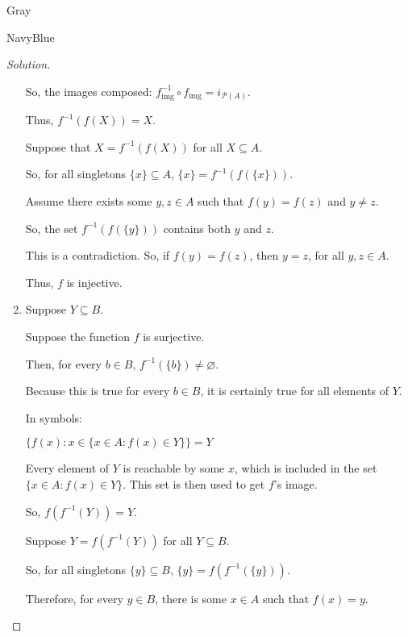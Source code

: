 \documentclass[12pt]{amsart}
\theoremstyle{named}
\newenvironment{soln}
{\begin{color}{Gray}\begin{framed}\begin{color}{NavyBlue}\begin{proof}[Solution]
\doublespacing}
{\end{proof}\end{color}\end{framed}\end{color}}
\theoremstyle{definition}
\begin{document}
\begin{soln}
\begin{enumerate}
        \noindent So, the images composed: $f^{-1}_\text{img} \circ f_\text{img} = i_{\mathscr P(A)}$.
        
        \noindent Thus, $f^{-1}(f(X)) = X$.

        \phantom{ }

        \noindent Suppose that $X = f^{-1}(f(X))$ for all $X \subseteq A$.

        \noindent So, for all singletons $\{x\} \subseteq A$, $\{x\} = f^{-1}(f(\{x\}))$.

        \noindent Assume there exists some $y,z \in A$ such that $f(y) = f(z)$ and $y \neq z$. 

        \noindent So, the set $f^{-1}(f(\{y\}))$ contains both $y$ and $z$. 

        \noindent This is a contradiction. So, if $f(y) = f(z)$, then $y = z$, for all $y,z \in A$.

        \noindent Thus, $f$ is injective.     

        \item
        \phantom{ }
        
        \noindent Suppose $Y \subseteq B$.

        \noindent Suppose the function $f$ is surjective. 

        \noindent Then, for every $b \in B$, $f^{-1}(\{b\}) \neq \varnothing$.
        

        \noindent Because this is true for every $b \in B$, it is certainly true
        for all elements of $Y$. 

        \noindent In symbols:

        \noindent $\{f(x) : x \in \{x \in A : f(x) \in Y\}\} = Y$

        \noindent Every element of $Y$ is reachable by some $x$, which is
        included in the set $\{x \in A : f(x) \in Y\}$. This set is then
        used to get $f$'s image. 

        \noindent So, $f(f^{-1}(Y)) = Y$. 

        \phantom{ }

        \noindent Suppose $Y = f(f^{-1}(Y))$ for all $Y \subseteq B$.

        \noindent So, for all singletons $\{y\} \subseteq B$, $\{y\} = f(f^{-1}(\{y\}))$.

        \noindent Therefore, for every $y \in B$, there is some $x \in A$ such that $f(x) = y$. 


    \end{enumerate}
\end{soln}
\end{document}

